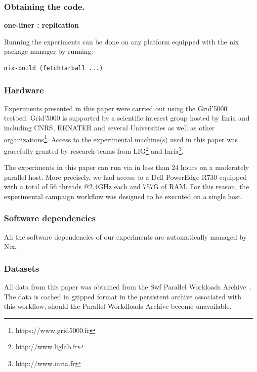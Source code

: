 \documentclass[sigconf,review]{acmart}
\begin{document}
\subsubsection{Obtaining the code.}

\textbf{one-liner : replication}

Running the experiments can be done on any platform equipped with the nix
package manager by running:

\begin{lstlisting}
nix-build (fetchTarball ...)
\end{lstlisting}

\subsubsection{Hardware}

 Experiments presented in this paper were carried out using the Grid'5000
 testbed. Grid'5000 is supported by a scientific interest group hosted by Inria
 and including CNRS, RENATER and several Universities as well as other
 organizations\footnote{https://www.grid5000.fr}.  Access to the experimental
 machine(s) used in this paper was gracefully granted by research teams from
 LIG\footnote{http://www.liglab.fr} and Inria\footnote{http://www.inria.fr}.

 The experiments in this paper can run via in less than 24 hours on a
 moderately parallel host. More precisely, we had access to a Dell PowerEdge
 R730 equipped with a total of 56 threads @2.4GHz each and 757G of RAM. For
 this reason, the experimental campaign workflow was designed to be executed on
 a single host.

\subsubsection{Software dependencies}

All the software dependencies of our experiments are automatically managed by Nix.

\subsubsection{Datasets}

All data from this paper was obtained from the Swf Parallel Workloads
Archive~\cite{Feitelson20142967}. The data is cached in gzipped format in the
persistent archive associated with this workflow, should the Parallel
Workdloads Archive become unavailable.
\end{document}
